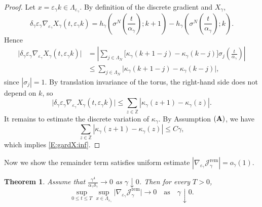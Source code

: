 \documentclass{article}
\newtheorem{theorem}{Theorem}
\begin{document}
\begin{proof}
Let \(x=\varepsilon_\gamma k\in\Lambda_{\varepsilon_\gamma}\). By definition of the
discrete gradient and \(X_\gamma\),
\[
\delta_\gamma\varepsilon_\gamma
\nabla_{\varepsilon_\gamma}X_\gamma(t,\varepsilon_\gamma k)
=
h_\gamma\!\left(\sigma^N\left(\frac{t}{\alpha_\gamma}\right);k+1\right)
-
h_\gamma\!\left(\sigma^N\left(\frac{t}{\alpha_\gamma}\right);k\right).
\]
Hence
\[
\begin{aligned}
\bigl|
\delta_\gamma\varepsilon_\gamma
\nabla_{\varepsilon_\gamma}X_\gamma(t,\varepsilon_\gamma k)
\bigr|
&=
\left|
\sum_{j\in\Lambda_N}
\bigl[\kappa_\gamma(k+1-j)-\kappa_\gamma(k-j)\bigr]
\sigma_j\!\left(\frac{t}{\alpha_\gamma}\right)
\right| \\
&\le
\sum_{j\in\Lambda_N}
\bigl|
\kappa_\gamma(k+1-j)-\kappa_\gamma(k-j)
\bigr|,
\end{aligned}
\]
since \(|\sigma_j|=1\). By translation invariance of the torus, the right-hand side does
not depend on \(k\), so
\[
\bigl|
\delta_\gamma\varepsilon_\gamma
\nabla_{\varepsilon_\gamma}X_\gamma(t,\varepsilon_\gamma k)
\bigr|
\le
\sum_{z\in\mathbb Z}
|\kappa_\gamma(z+1)-\kappa_\gamma(z)|.
\]
It remains to estimate the discrete variation of \(\kappa_\gamma\).
By Assumption \(({\bf A})\), we have
\[
\sum_{z\in\mathbb Z}|\kappa_\gamma(z+1)-\kappa_\gamma(z)|
\le C\gamma,
\]
which implies \eqref{E:gardX:inf}.
\end{proof}


Now we show the remainder term satisfies uniform estimate $|\nabla_{\varepsilon_{\gamma}}\mathcal J_\gamma^{\mathrm{rem}}| = o_\gamma(1)$.

\begin{theorem}\label{thm:remainder-expansion}
Assume that
\(
\frac{\gamma^4}{\alpha_\gamma\delta_\gamma}
\rightarrow 0 
\)
as \(\gamma\downarrow0\).
Then for every \(T>0\),
\[
\sup_{0\le t\le T}\sup_{x\in\Lambda_{\varepsilon_\gamma}}
\bigl|
\nabla_{\varepsilon_\gamma}\mathcal J_\gamma^{\mathrm{rem}}
\bigr|
\rightarrow 0 \quad \text{as} \quad \gamma\downarrow0.
\]
\end{theorem}
\end{document}
